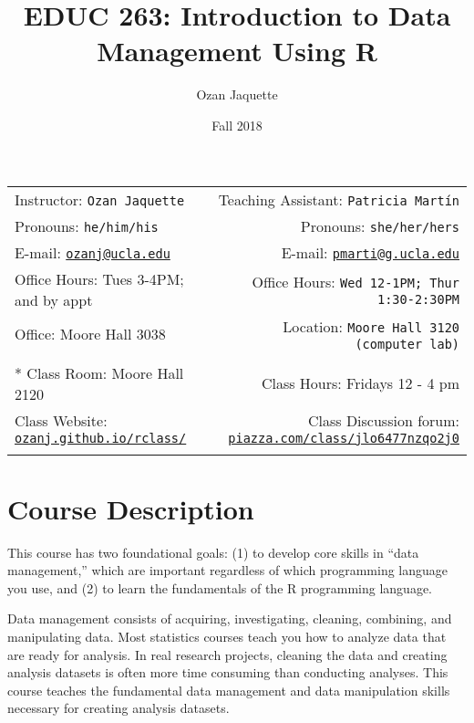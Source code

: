 \documentclass[11pt,]{article}
\title{EDUC 263: Introduction to Data Management Using R}
\author{Ozan Jaquette}
\date{Fall 2018}
\begin{document}
  

		\maketitle
		
	
		\thispagestyle{firststyle}



	\noindent \begin{tabular*}{\textwidth}{ @{\extracolsep{\fill}} lr @{\extracolsep{\fill}}}


Instructor: \texttt{Ozan Jaquette} & Teaching Assistant: \texttt{Patricia Martín} \\
Pronouns: \texttt{he/him/his} & Pronouns: \texttt{she/her/hers} \\
E-mail: \texttt{\href{mailto:ozanj@ucla.edu}{\nolinkurl{ozanj@ucla.edu}}} & E-mail: \texttt{\href{mailto:pmarti@g.ucla.edu}{\nolinkurl{pmarti@g.ucla.edu}}} \\ 
Office Hours: Tues 3-4PM; and by appt  & Office Hours: \texttt{Wed 12-1PM; Thur 1:30-2:30PM} \\
Office: Moore Hall 3038 & Location: \texttt{Moore Hall 3120 (computer lab)} \\
\\ *
Class Room: Moore Hall 2120 & Class Hours: Fridays 12 - 4 pm\\
Class Website: \href{http://ozanj.github.io/rclass/}{\tt ozanj.github.io/rclass/} & Class Discussion forum: \href{http://piazza.com/class/jlo6477nzqo2j0}{\tt piazza.com/class/jlo6477nzqo2j0}\\
	&  \\
	\hline
	\end{tabular*}
	
\vspace{2mm}
	


\section{Course Description}\label{course-description}

This course has two foundational goals: (1) to develop core skills in
``data management,'' which are important regardless of which programming
language you use, and (2) to learn the fundamentals of the R programming
language.

Data management consists of acquiring, investigating, cleaning,
combining, and manipulating data. Most statistics courses teach you how
to analyze data that are ready for analysis. In real research projects,
cleaning the data and creating analysis datasets is often more time
consuming than conducting analyses. This course teaches the fundamental
data management and data manipulation skills necessary for creating
analysis datasets.
\end{document}
